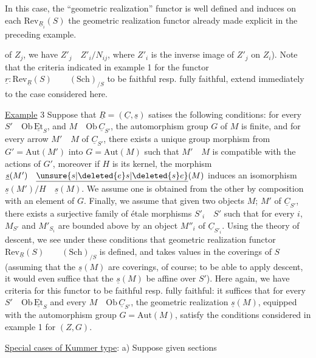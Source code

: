In this case, the ``geometric realization'' functor is well defined and induces on each $\mathrm{Rev}_{\underline{R}_i}(S)$ the geometric realization functor already made explicit in \hspace{3em} the preceding example.

of $Z_j$, we have $Z'_j\quad Z'_i/N_{ij}$, where $Z'_i$ is the inverse image of $Z'_j$ on $Z_i$). Note that the criteria indicated in example 1 for the functor $\underline{r}:\mathrm{Rev}_{\underline{R}}(S)\qquad(\mathrm{Sch})_{/S}$ to be faithful resp. fully faithful, extend immediately to the case considered here.

\uline{Example} 3 Suppose that $\underline{R}=(\underline{C},\underline{s})$ satises the following conditions: for every $S'\quad\mathrm{Ob}\,\underline{\mathrm{Et}}_S$, and $M\quad\mathrm{Ob}\,\underline{C}_{S'}$, the automorphism group $G$ of $M$ is finite, and for every arrow $M'\quad M$ of $\underline{C}_{S'}$, there exists a unique group morphism from $G'=\mathrm{Aut}(M')$ into $G=\mathrm{Aut}(M)$ such that $M'\quad M$ is compatible with the actions of $G'$, moreover if $H$ is its kernel, the morphism $\underline{s}(M')\quad\underline{\unsure{s|\deleted{e}s|\deleted{s}e}}(M)$ induces an isomorphism $\underline{s}(M')/H\quad\underline{s}(M)$.  We assume  one is obtained from the other by composition with an element of $G$. Finally, we assume that given two objects $M$; $M'$ of $\underline{C}_{S'}$, there exists a surjective family of étale morphisms $S'_i\quad S'$ such that for every $i$, $M_{S'}$ and $M'_{S_i}$ are bounded above by an object $M''_i$ of $\underline{C}_{S'_i}$. Using the theory of descent, we see under these conditions that  geometric realization functor  $\mathrm{Rev}_{\underline{R}}(S)\qquad(\mathrm{Sch})_{/S}$ is defined, and takes values in the  coverings of $S$ (assuming that the $\underline{s}(M)$ are coverings, of course; to be able to apply descent, it would even suffice that the $\underline{s}(M)$ be affine over $S'$). Here again, we have criteria for this functor to be faithful resp. fully faithful: it suffices that for every $S'\quad\mathrm{Ob}\,\underline{\mathrm{Et}}_S$ and every $M\quad\mathrm{Ob}\,\underline{C}_{S'}$, the geometric realization $\underline{s}(M)$, equipped with the automorphism group $G=\mathrm{Aut}(M)$, satisfy the  conditions considered in example 1 for $(Z,G)$.

\uline{Special cases of Kummer type}: a) Suppose given sections
